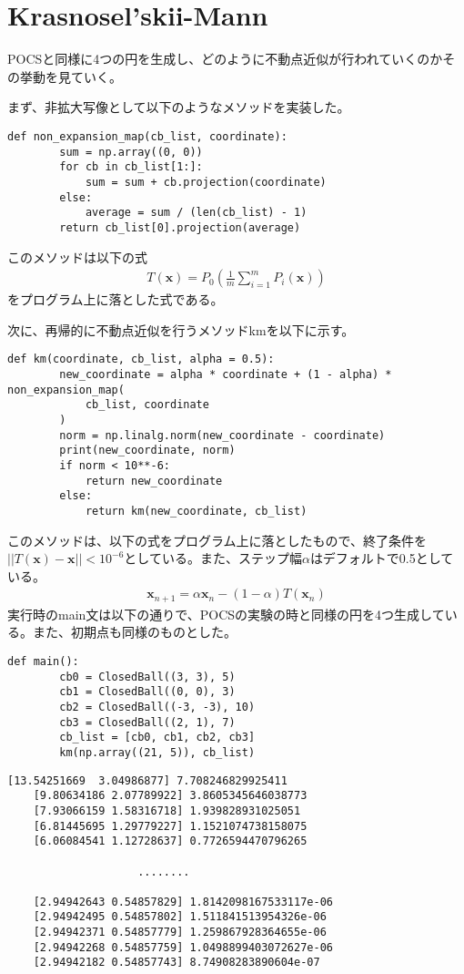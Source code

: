 \documentclass{jsarticle}
\begin{document}
\section*{Krasnosel'skii-Mann}
POCSと同様に4つの円を生成し、どのように不動点近似が行われていくのかその挙動を見ていく。
\par まず、非拡大写像として以下のようなメソッドを実装した。
\begin{lstlisting}[caption = 非拡大写像]
    def non_expansion_map(cb_list, coordinate):
        sum = np.array((0, 0))
        for cb in cb_list[1:]:
            sum = sum + cb.projection(coordinate)
        else:
            average = sum / (len(cb_list) - 1)
        return cb_list[0].projection(average)
\end{lstlisting}
\par このメソッドは以下の式
\large
\begin{eqnarray}
    T(\bm{x}) = P_0\left(\frac{1}{m}\sum^m_{i=1}P_i(\bm{x})\right) \nonumber
\end{eqnarray}
\normalsize
をプログラム上に落とした式である。
\par 次に、再帰的に不動点近似を行うメソッドkmを以下に示す。
\begin{lstlisting}[caption = Krasnosel'skii-Mann メソッド]
    def km(coordinate, cb_list, alpha = 0.5):
        new_coordinate = alpha * coordinate + (1 - alpha) * non_expansion_map(
            cb_list, coordinate
        )
        norm = np.linalg.norm(new_coordinate - coordinate)
        print(new_coordinate, norm)
        if norm < 10**-6:
            return new_coordinate
        else:
            return km(new_coordinate, cb_list)
\end{lstlisting}
このメソッドは、以下の式をプログラム上に落としたもので、終了条件を$||T(\bm{x}) - \bm{x}|| < 10^{-6}$としている。また、ステップ幅$\alpha$はデフォルトで0.5としている。
\large
\begin{eqnarray}
    \bm{x}_{n+1} = \alpha\bm{x}_n - (1 - \alpha)T(\bm{x}_n) \nonumber
\end{eqnarray}
\normalsize
実行時のmain文は以下の通りで、POCSの実験の時と同様の円を4つ生成している。また、初期点も同様のものとした。
\begin{lstlisting}[caption = main文]
    def main():
        cb0 = ClosedBall((3, 3), 5)
        cb1 = ClosedBall((0, 0), 3)
        cb2 = ClosedBall((-3, -3), 10)
        cb3 = ClosedBall((2, 1), 7)
        cb_list = [cb0, cb1, cb2, cb3]
        km(np.array((21, 5)), cb_list)
\end{lstlisting}
\begin{lstlisting}[caption = 出力結果]
    [13.54251669  3.04986877] 7.708246829925411
    [9.80634186 2.07789922] 3.8605345646038773
    [7.93066159 1.58316718] 1.939828931025051
    [6.81445695 1.29779227] 1.1521074738158075
    [6.06084541 1.12728637] 0.7726594470796265

                    ........

    [2.94942643 0.54857829] 1.8142098167533117e-06
    [2.94942495 0.54857802] 1.511841513954326e-06
    [2.94942371 0.54857779] 1.259867928364655e-06
    [2.94942268 0.54857759] 1.0498899403072627e-06
    [2.94942182 0.54857743] 8.74908283890604e-07
\end{lstlisting}
\end{document}
